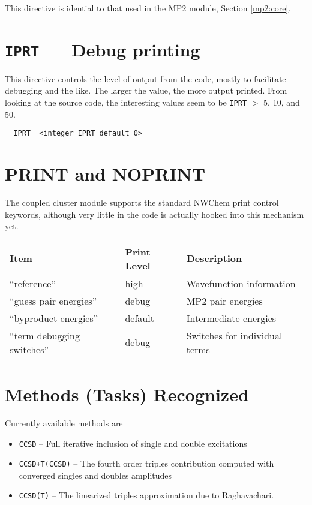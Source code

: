 This directive is idential to that used in the MP2 module, Section
\ref{mp2:core}.

\section{{\tt IPRT} --- Debug printing}

This directive controls the level of output from the code, mostly to
facilitate debugging and the like.  The larger the value, the more
output printed.  From looking at the source code, the interesting
values seem to be \verb+IPRT+ $>$ 5, 10, and 50.

\begin{verbatim}
  IPRT  <integer IPRT default 0>
\end{verbatim}

\section{PRINT and NOPRINT}

The coupled cluster module supports the standard NWChem print control
keywords, although very little in the code is actually hooked into
this mechanism yet.

\begin{tabular}{lll}
\hline\hline
Item                    & Print Level   & Description \\
\hline
``reference''             & high          & Wavefunction information\\
``guess pair energies'' & debug & MP2 pair energies\\
``byproduct energies'' & default & Intermediate energies   \\
``term debugging switches'' & debug & Switches for individual terms \\
\hline\hline
\end{tabular}


\section{Methods (Tasks) Recognized}

Currently available methods are
\begin{itemize}
\item \verb+CCSD+ -- Full iterative inclusion of single and double
excitations
\item \verb=CCSD+T(CCSD)= -- The fourth order triples contribution computed with
converged singles and doubles amplitudes
\item \verb=CCSD(T)= -- The linearized triples approximation due to
  Raghavachari.
\end{itemize}

